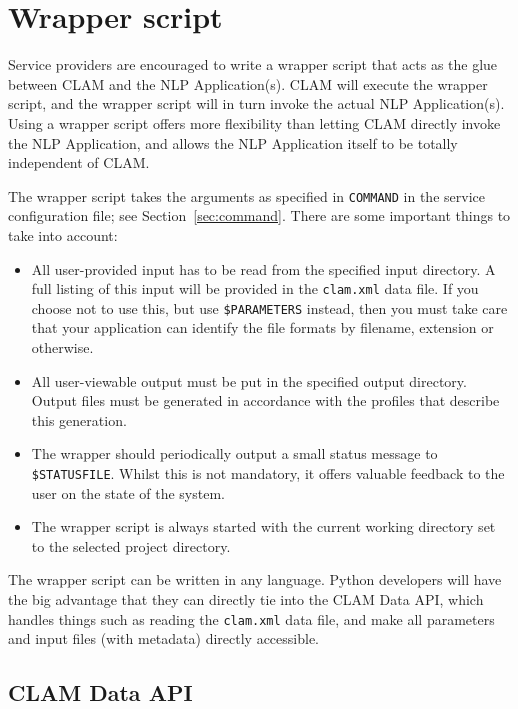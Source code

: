 \documentclass[a4paper,12pt]{report}
\begin{document}
\section{Wrapper script}

Service providers are encouraged to write a wrapper script that acts as the glue between CLAM and the NLP Application(s). CLAM will execute the wrapper script, and the wrapper script will in turn invoke the actual NLP Application(s). Using a wrapper script offers more flexibility than letting CLAM directly invoke the NLP Application, and allows the NLP Application itself to be totally independent of CLAM. 

The wrapper script takes the arguments as specified in \texttt{COMMAND} in the service configuration file; see Section~\ref{sec:command}. There are some important things to take into account:

\begin{itemize}
\item All user-provided input has to be read from the specified input directory. A full listing of this input will be provided in the \texttt{clam.xml} data file. If you choose not to use this, but use \texttt{\$PARAMETERS} instead, then you must take care that your application can identify the file formats by filename, extension or otherwise.
\item All user-viewable output must be put in the specified output directory. Output files must be generated in accordance with the profiles that describe this generation. 
\item The wrapper should periodically output a small status message to \texttt{\$STATUSFILE}. Whilst this is not mandatory, it offers valuable feedback to the user on the state of the system. 
\item The wrapper script is always started with the current working directory set to the selected project directory.
\end{itemize}

The wrapper script can be written in any language. Python developers will have the big advantage that they can directly tie into the CLAM Data API, which handles things such as reading the \texttt{clam.xml} data file, and make all parameters and input files (with metadata) directly accessible.

\subsection{CLAM Data API}
\end{document}

